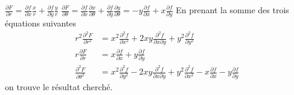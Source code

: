 {{$\frac{\partial F}{\partial r}=
\frac{\partial f}{\partial x}\frac xr+ \frac{\partial f}{\partial y}\frac yr$
$\frac{\partial F}{\partial \theta}=
\frac{\partial f}{\partial x}\frac{\partial x}{\partial \theta}
+ \frac{\partial f}{\partial y}\frac{\partial y}{\partial \theta}
= -y \frac{\partial f}{\partial x}+x\frac{\partial f}{\partial y}
$
En prenant la somme des trois \'equations suivantes
\begin{align*}
r^2 \frac{\partial^2 F}{\partial r^2}&=
x^2 \frac{\partial^2 f}{\partial x^2}
+2xy \frac{\partial^2 f}{\partial x \partial y}
+
y^2 \frac{\partial^2 f}{\partial y^2}
\\
r\frac{\partial F}{\partial r}&=
x\frac{\partial f}{\partial x}+ y\frac{\partial f}{\partial y}
\\
\frac{\partial^2 F}{\partial \theta^2}&=
x^2 \frac{\partial^2 f}{\partial y^2}
-2xy \frac{\partial^2 f}{\partial x \partial y}
+
y^2 \frac{\partial^2 f}{\partial x^2}
-
x \frac{\partial f}{\partial x}
-
y\frac{\partial f}{\partial y}
\end{align*}
on trouve le r\'esultat cherch\'e.
}
}
